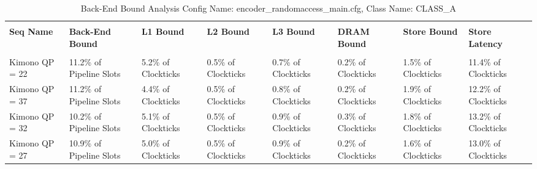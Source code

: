 \documentclass{article}%
\begin{document}
\newpage%
\begin{longtabu}{| X[l] | X[l] | X[l] | X[l] | X[l] | X[l] | X[l] | X[l] |}%
\caption{%
Back{-}End Bound Analysis\newline%
 Config Name: encoder\_randomaccess\_main.cfg,\newline%
 Class Name: CLASS\_A\newline%
%
}%
\hline%
&&&&&&&\\%
\textbf{Seq Name}&\textbf{Back{-}End Bound}&\textbf{L1 Bound}&\textbf{L2 Bound}&\textbf{L3 Bound}&\textbf{DRAM Bound}&\textbf{Store Bound}&\textbf{Store Latency}\\%
&&&&&&&\\%
\hline%
\endhead%
Kimono\newline%
 QP = 22&11.2\% of Pipeline Slots&5.2\% of Clockticks&0.5\% of Clockticks&0.7\% of Clockticks&0.2\% of Clockticks&1.5\% of Clockticks&11.4\% of Clockticks\\%
\hline%
Kimono\newline%
 QP = 37&11.2\% of Pipeline Slots&4.4\% of Clockticks&0.5\% of Clockticks&0.8\% of Clockticks&0.2\% of Clockticks&1.9\% of Clockticks&12.2\% of Clockticks\\%
\hline%
Kimono\newline%
 QP = 32&10.2\% of Pipeline Slots&5.1\% of Clockticks&0.5\% of Clockticks&0.9\% of Clockticks&0.3\% of Clockticks&1.8\% of Clockticks&13.2\% of Clockticks\\%
\hline%
Kimono\newline%
 QP = 27&10.9\% of Pipeline Slots&5.0\% of Clockticks&0.5\% of Clockticks&0.9\% of Clockticks&0.2\% of Clockticks&1.6\% of Clockticks&13.0\% of Clockticks\\%
\hline%
\end{longtabu}%
\newpage

%
\end{document}
